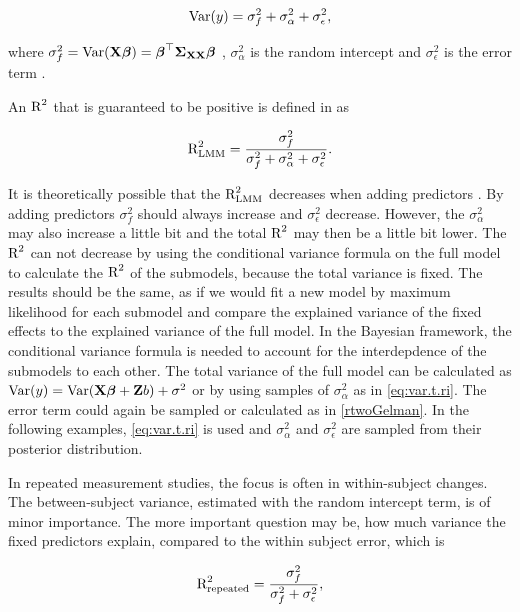 \documentclass[11pt,a4paper,twoside]{book}
\begin{document}
      \begin{align} 
        \operatorname{Var}(y) = \sigma_{f}^2  + \sigma_{\alpha}^2 + \sigma_{\epsilon}^2, \label{eq:var.t.ri} 
        \end{align}

where $\sigma_{f}^2 = \operatorname{Var}({\mathbf{X}} {\boldsymbol{\beta}}) = {\boldsymbol{\beta}}^\top {\boldsymbol{\Sigma}}{}_{{\mathbf{X}} {\mathbf{X}}}  {\boldsymbol{\beta}}$ , $\sigma_{\alpha}^2 $ is the random intercept and $\sigma_{\epsilon}^2$ is the error term \citep{Nakagawa2013}. 

An $\text{R}^2$ that is guaranteed to be positive is defined in \cite{Nakagawa2013} as

   \begin{align} 
\text{R}^2_{\text{LMM}} = \frac{\sigma_{f}^2}{\sigma_{f}^2 + \sigma_{\alpha}^2 + \sigma_{\epsilon}^2}.
\end{align}


 It is theoretically possible that the $\text{R}^2_{\text{LMM}}$ decreases when adding predictors \citep{Nakagawa2013}.  By adding predictors $\sigma_{f}^2$  should always increase and  $\sigma_{\epsilon}^2$  decrease. However, the $\sigma_{\alpha}^2$ may also increase a little bit and the total $\text{R}^2$ may then be a little bit lower. The $\text{R}^2$ can not decrease by using the conditional variance formula on the full model to calculate the $\text{R}^2$ of the submodels, because the total variance is fixed. The results should be the same, as if we would fit a new model by maximum likelihood for each submodel and  compare the explained variance of the fixed effects to the explained variance of the full model.  In the Bayesian framework, the conditional variance formula is needed to account for the interdepdence of the submodels to each other. The total variance of the full model can be calculated as  $\operatorname{Var}(y) = \operatorname{Var}({\mathbf{X}} {\boldsymbol{\beta}} + {\mathbf{Z}} b) + \sigma^2$ or by using samples of $\sigma_{\alpha}^2$ as in \eqref{eq:var.t.ri}. The error term could again be sampled or calculated as in \eqref{rtwoGelman}. In the following examples, \eqref{eq:var.t.ri} is used and  $\sigma_{\alpha}^2$ and $\sigma_{\epsilon}^2$ are sampled from their posterior distribution.

In repeated measurement studies, the focus is often in within-subject changes. The between-subject variance, estimated with the random intercept term, is of minor importance. The more important question may be, how much variance the fixed predictors explain, compared to the within subject error, which is

   \begin{align} 
\text{R}^2_{\text{repeated}} = \frac{\sigma_{f}^2}{\sigma_{f}^2  + \sigma_{\epsilon}^2}, \label{rtwo.repeated}
\end{align}
\end{document}
